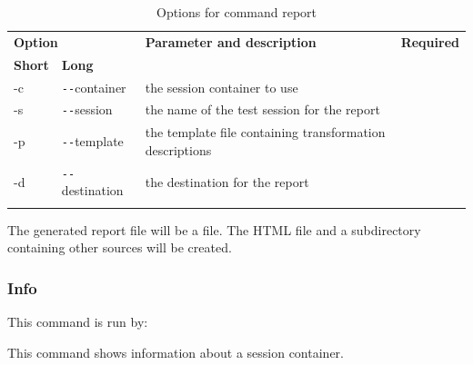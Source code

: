 \begin{longtable}{|l|l|p{73mm}|c|}\hline
   \multicolumn{2}{|l|}{\textbf{Option}} & 
   {\textbf{Parameter and description}} & 
   {\textbf{Required}} \\
   {\textbf{Short}} &
   {\textbf{Long}} &
    & 
    \\\hline \hline \endhead
   -c & \verb$--$container & the session container to use & \x \\\hline
   -s & \verb$--$session & the name of the test session for the report & \x \\\hline
   -p & \verb$--$template & the template file containing transformation descriptions & \x \\\hline
   -d & \verb$--$destination & the destination for the report & \x \\\hline
  \caption{Options for command report}
  \label{fr_tb:Options for command report}
\end{longtable}
\par
The generated report file will be a  file. The HTML file and a subdirectory containing other sources will be created.

\subsubsection{Info}
This command is run by:
\begin{quote}
\end{quote}
\par
This command shows information about a session container.

